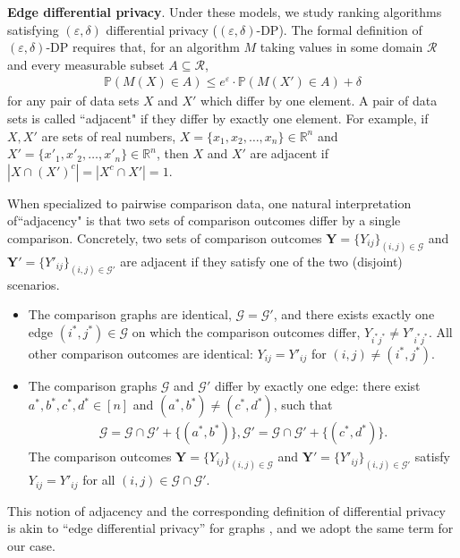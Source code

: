\documentclass[letterpaper,12pt]{article}
\numberwithin{equation}{section}
\theoremstyle{plain}
\numberwithin{Theorem}{section}
\numberwithin{corollary}{section}
\numberwithin{proposition}{section}
\numberwithin{Lemma}{section}
{
	\theoremstyle{definition}
	\newtheorem{Definition}{Definition}
	\newtheorem{example}{Example}
	\numberwithin{example}{section}
	\newtheorem{fact}{Fact}
	\numberwithin{fact}{section}
	\newtheorem{remark}{Remark}
}
\newcommand{\Pro}{\mathbb{P}}
\newcommand{\1}{\mathbbm{1}}
\def\R{{\mathbb R}}
\begin{document}
{\bf Edge differential privacy}. Under these models, we study ranking algorithms satisfying $(\varepsilon, \delta)$ differential privacy ($(\varepsilon, \delta)$-DP). The formal definition of $(\varepsilon, \delta)$-DP requires that, for an algorithm $M$ taking values in some domain $\mathcal R$ and every measurable subset $A \subseteq \mathcal R$,
\begin{align*}
	\Pro(M(X) \in A) \leq e^\varepsilon \cdot \Pro(M(X') \in A) + \delta
\end{align*}
for any pair of data sets $X$ and $X'$ which differ by one element. A pair of data sets is called ``adjacent" if they differ by exactly one element. For example, if $X, X'$ are sets of real numbers, $X = \{x_1, x_2, \ldots, x_n\} \in \R^n $ and $X' = \{x'_1, x'_2, \ldots, x'_n\} \in \R^n$, then $X$ and $X'$ are adjacent if $|X \cap (X')^c| = |X^c \cap X'| = 1$.

When specialized to pairwise comparison data, one natural interpretation of``adjacency" is that two sets of comparison outcomes differ by a single comparison. Concretely, two sets of comparison outcomes $\bm Y = \{Y_{ij}\}_{(i, j) \in \mathcal G}$ and $\bm Y' = \{Y'_{ij}\}_{(i, j) \in \mathcal G'}$ are adjacent if they satisfy one of the two (disjoint) scenarios.
\begin{itemize}
	\item The comparison graphs are identical, $\mathcal G = \mathcal G'$, and there exists exactly one edge $(i^*, j^*) \in \mathcal G$ on which the comparison outcomes differ, $Y_{i^*j^*} \neq Y'_{i^*j^*}$. All other comparison outcomes are identical: $Y_{ij} = Y'_{ij}$ for $(i, j) \neq (i^*, j^*)$.
	\item The comparison graphs $\mathcal G$ and $\mathcal G'$ differ by exactly one edge: there exist $a^*, b^*, c^*, d^* \in [n]$ and $(a^*, b^*) \neq (c^*, d^*)$, such that
	\begin{align*}
		\mathcal G = \mathcal G \cap \mathcal G' + \{(a^*, b^*) \}, \mathcal G' = \mathcal G \cap \mathcal G' + \{(c^*, d^*) \}.
	\end{align*}
	The comparison outcomes  $\bm Y = \{Y_{ij}\}_{(i, j) \in \mathcal G}$ and $\bm Y' = \{Y'_{ij}\}_{(i, j) \in \mathcal G'}$ satisfy $Y_{ij} = Y'_{ij}$ for all $(i, j) \in \mathcal G \cap \mathcal G'$.
\end{itemize} 
This notion of adjacency and the corresponding definition of differential privacy is akin to ``edge differential privacy'' for graphs \cite{nissim2007smooth, kasiviswanathan2013analyzing}, and we adopt the same term for our case.
\end{document}
